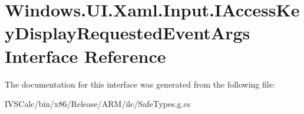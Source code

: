 \hypertarget{interface_windows_1_1_u_i_1_1_xaml_1_1_input_1_1_i_access_key_display_requested_event_args}{}\section{Windows.\+U\+I.\+Xaml.\+Input.\+I\+Access\+Key\+Display\+Requested\+Event\+Args Interface Reference}
\label{interface_windows_1_1_u_i_1_1_xaml_1_1_input_1_1_i_access_key_display_requested_event_args}


The documentation for this interface was generated from the following file\+:\begin{DoxyCompactItemize}
\item 
I\+V\+S\+Calc/bin/x86/\+Release/\+A\+R\+M/ilc/Safe\+Types.\+g.\+cs\end{DoxyCompactItemize}
